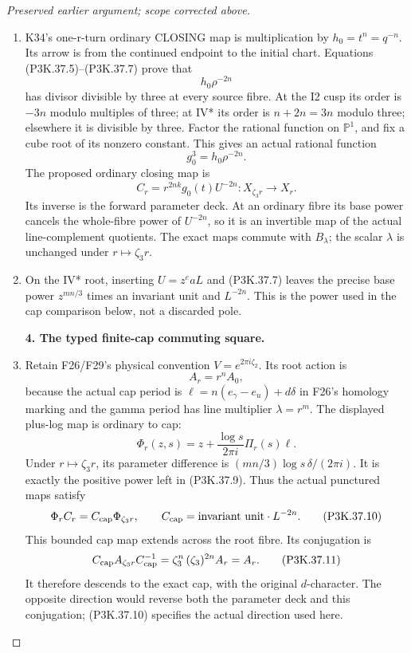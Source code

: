 \begin{proof}[Preserved earlier argument; scope corrected above]
\begin{enumerate}[label=\arabic*.]
\par\medskip\noindent\textbf{3. The global rational endpoint.}\enspace

\item K34's one-r-turn ordinary CLOSING map is multiplication by
\(h_0=t^n=q^{-n}\). Its arrow is from the continued endpoint to the
initial chart. Equations (P3K.37.5)--(P3K.37.7) prove that
\[
                    h_0\rho^{-2n}
\]
has divisor divisible by three at every source fibre. At the I2 cusp its
order is \(-3n\) modulo multiples of three; at IV* its order is
\(n+2n=3n\) modulo three; elsewhere it is divisible by three.
Factor the rational function on \(\mathbb P^1\), and fix a cube root
of its nonzero constant. This gives an actual rational function
\[
                    g_0^3=h_0\rho^{-2n}.                         \tag{P3K.37.8}
\]
The proposed ordinary closing map is
\[
 C_r=r^{2nk}g_0(t)U^{-2n}: X_{\zeta_3r}\longrightarrow X_r.
                                                                    \tag{P3K.37.9}
\]
Its inverse is the forward parameter deck. At an ordinary fibre its base
power cancels the whole-fibre power of \(U^{-2n}\), so it is an
invertible map of the actual line-complement quotients. The exact maps
commute with \(B_\lambda\); the scalar \(\lambda\) is unchanged
under \(r\mapsto\zeta_3r\).

\item On the IV* root, inserting \(U=z^eaL\) and (P3K.37.7) leaves the precise
base power \(z^{mn/3}\) times an invariant unit and \(L^{-2n}\).
This is the power used in the cap comparison below, not a discarded pole.

\par\medskip\noindent\textbf{4. The typed finite-cap commuting square.}\enspace

\item Retain F26/F29's physical convention \(V=e^{2\pi i\zeta_2}\).
Its root action is
\[
 A_r=r^n A_0,
\]
because the actual cap period is
\(\ell=n(e_\gamma-e_u)+d\delta\) in F26's homology marking and the
gamma period has line multiplier \(\lambda=r^m\).
The displayed plus-log map is ordinary to cap:
\[
 \Phi_r(z,s)=z+\frac{\log s}{2\pi i}\Pi_r(s)\ell.
\]
Under \(r\mapsto\zeta_3r\), its parameter difference is
\((mn/3)\log s\,\delta/(2\pi i)\). It is exactly the positive
power left in (P3K.37.9). Thus the actual punctured maps satisfy
\[
 \Phi_r C_r=C_{\rm cap}\Phi_{\zeta_3r},\qquad
 C_{\rm cap}=\text{invariant unit}\cdot L^{-2n}.                 \tag{P3K.37.10}
\]
This bounded cap map extends across the root fibre. Its conjugation is
\[
 C_{\rm cap} A_{\zeta_3r} C_{\rm cap}^{-1}
   =\zeta_3^n\,(\zeta_3)^{2n} A_r=A_r.                         \tag{P3K.37.11}
\]
It therefore descends to the exact cap, with the original \(d\)-character.
The opposite direction would reverse both the parameter deck and this
conjugation; (P3K.37.10) specifies the actual direction used here.


\end{enumerate}
\end{proof}
